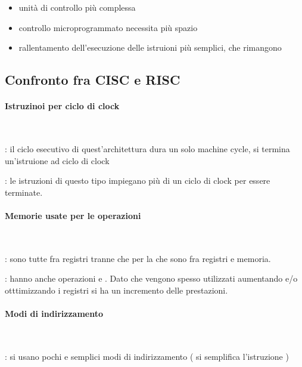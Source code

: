 \documentclass[arch.tex]{subfiles}
\begin{document}
\begin{itemize}
	\item unità di controllo più complessa
	\item controllo microprogrammato necessita più spazio
	\item rallentamento dell'esecuzione delle istruioni più semplici, che rimangono
\end{itemize}

\subsection{Confronto fra CISC e RISC}%
\label{sub:confronto_fra_cisc_e_risc}

\paragraph{Istruzinoi per ciclo di clock} \mbox{} \\%
\label{par:istruzinoi_per_ciclo_di_clock}

: il ciclo esecutivo di quest'architettura dura un solo machine cycle, 
 si termina un'istruione ad  ciclo di clock

: le istruzioni di questo tipo impiegano più di un ciclo di clock per essere 
terminate.

\paragraph{Memorie usate per le operazioni} \mbox{} \\%
\label{par:memorie_usate_per_le_operazioni}

: sono tutte fra registri tranne che per la  che sono fra registri e 
memoria.

: hanno anche operazioni  e . Dato che 
vengono spesso utilizzati  aumentando e/o otttimizzando i registri
si ha un incremento delle prestazioni.

\paragraph{Modi di indirizzamento} \mbox{} \\%
\label{par:modi_di_indirizzamento}

: si usano pochi e semplici modi di indirizzamento ( si semplifica l'istruzione ) 
\end{document}
